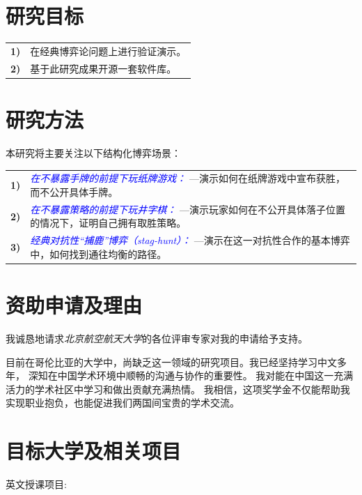 \documentclass[conference]{IEEEtran}
\begin{document}
\vspace{5pt}
\section{研究目标}

\begin{tabular}{lp{210pt}}
    {\small \textbf{1)}} & {\small 在经典博弈论问题上进行验证演示。} \\
    {\small \textbf{2)}} & {\small 基于此研究成果开源一套软件库。}
\end{tabular}

\section{研究方法}
\vspace{5pt}
本研究将主要关注以下结构化博弈场景：
\vspace{5pt}

\begin{tabular}{lp{210pt}}
    {\small \textbf{1)}} & {\textcolor{blue}{\textit{在不暴露手牌的前提下玩纸牌游戏：}} \linebreak---演示如何在纸牌游戏中宣布获胜，而不公开具体手牌。 } \\
    {\small \textbf{2)}} & {\textcolor{blue}{\textit{在不暴露策略的前提下玩井字棋：}} \linebreak---演示玩家如何在不公开具体落子位置的情况下，证明自己拥有取胜策略。} \\
    {\small \textbf{3)}} & {\textcolor{blue}{\textit{经典对抗性“捕鹿”博弈（stag-hunt）：}} \linebreak---演示在这一对抗性合作的基本博弈中，如何找到通往均衡的路径。}
\end{tabular}

\section{资助申请及理由}
我诚恳地请求\textit{北京航空航天大学}的各位评审专家对我的申请给予支持。 

目前在哥伦比亚的大学中，尚缺乏这一领域的研究项目。我已经坚持学习中文多年，
深知在中国学术环境中顺畅的沟通与协作的重要性。
我对能在中国这一充满活力的学术社区中学习和做出贡献充满热情。
我相信，这项奖学金不仅能帮助我实现职业抱负，也能促进我们两国间宝贵的学术交流。

\section{目标大学及相关项目}
\vspace{5pt}
{\small 英文授课项目:} \\
\end{document}
